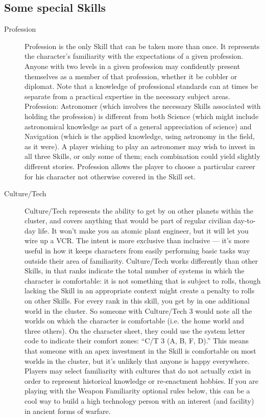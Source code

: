 \subsection{Some special Skills}\label{sec:Some special Skills} %

\begin{description}
\item[Profession]
Profession is the only Skill that can be taken more than once. It represents the character's familiarity with the expectations of a given profession. Anyone with two levels in a given profession may confidently present themselves as a member of that profession, whether it be cobbler or diplomat. Note that a knowledge of professional standards can at times be separate from a practical expertise in the necessary subject areas. Profession: Astronomer (which involves the necessary Skills associated with holding the profession) is different from both Science (which might include astronomical knowledge as part of a general appreciation of science) and Navigation (which is the applied knowledge, using astronomy in the field, as it were). A player wishing to play an astronomer may wish to invest in all three Skills, or only some of them; each combination could yield slightly different stories. Profession allows the player to choose a particular career for his character not otherwise covered in the Skill set.

\item[Culture/Tech]
Culture/Tech represents the ability to get by on other planets within the cluster, and covers anything that would be part of regular civilian day-to-day life. It won't make you an atomic plant engineer, but it will let you wire up a VCR. The intent is more exclusive than inclusive --- it's more useful in how it keeps characters from easily performing basic tasks way outside their area of familiarity. Culture/Tech works differently than other Skills, in that ranks indicate the total number of systems in which the character is comfortable: it is not something that is subject to rolls, though lacking the Skill in an appropriate context might create a penalty to rolls on other Skills. For every rank in this skill, you get by in one additional world in the cluster. So someone with Culture/Tech 3 would note all the worlds on which the character is comfortable (i.e. the home world and three others). On the character sheet, they could use the system letter code to indicate their comfort zones: ``C/T 3 (A, B, F, D).'' This means that someone with an apex investment in the Skill is comfortable on most worlds in the cluster, but it's unlikely that anyone is happy everywhere. Players may select familiarity with cultures that do not actually exist in order to represent historical knowledge or re-enactment hobbies. If you are playing with the Weapon Familiarity optional rules below, this can be a cool way to build a high technology person with an interest (and facility) in ancient forms of warfare.


\end{description}

